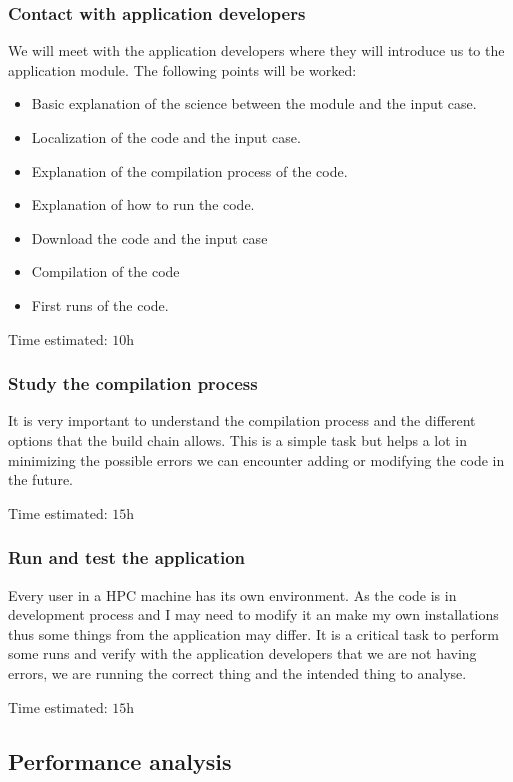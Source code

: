 \subsubsection{Contact with application developers}

\justify
We will meet with the application developers where they will introduce us to the application module. The following points will be worked:
\begin{itemize}
  \item Basic explanation of the science between the module and the input case.
  \item Localization of the code and the input case.
  \item Explanation of the compilation process of the code.
  \item Explanation of how to run the code.
  \item Download the code and the input case
  \item Compilation of the code
  \item First runs of the code.
\end{itemize}

\justify
Time estimated: $\si{10\hour}$
\subsubsection{Study the compilation process}

\justify
It is very important to understand the compilation process and the different options that the build chain allows. This is a simple task but helps a lot in minimizing the possible errors we can encounter adding or modifying the code in the future.

\justify
Time estimated: $\si{15\hour}$

\subsubsection{Run and test the application}
\justify
Every user in a HPC machine has its own environment. As the code is in development process and I may need to modify it an make my own installations thus some things from the application may differ. It is a critical task to perform some runs and verify with the application developers that we are not having errors, we are running the correct thing and the intended thing to analyse.  

\justify
Time estimated: $\si{15\hour}$

\subsection{Performance analysis}


